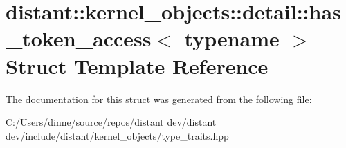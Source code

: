 \hypertarget{structdistant_1_1kernel__objects_1_1detail_1_1has__token__access}{}\section{distant\+:\+:kernel\+\_\+objects\+:\+:detail\+:\+:has\+\_\+token\+\_\+access$<$ typename $>$ Struct Template Reference}
\label{structdistant_1_1kernel__objects_1_1detail_1_1has__token__access}


The documentation for this struct was generated from the following file\+:\begin{DoxyCompactItemize}
\item 
C\+:/\+Users/dinne/source/repos/distant dev/distant dev/include/distant/kernel\+\_\+objects/type\+\_\+traits.\+hpp\end{DoxyCompactItemize}
